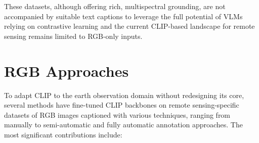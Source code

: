 \documentclass[a4paper, oneside, english]{sapthesis} %
\begin{document}
These datasets, although offering rich, multispectral grounding, are not accompanied by suitable text captions to leverage the full potential of VLMs relying on contrastive learning and the current CLIP-based landscape for remote sensing remains limited to RGB-only inputs.


\section{RGB Approaches}

To adapt CLIP to the earth observation domain without redesigning its core, several methods have fine-tuned CLIP backbones on remote sensing-specific datasets of RGB images captioned with various techniques, ranging from manually to semi-automatic and fully automatic annotation approaches. The most significant contributions include:
\end{document}

